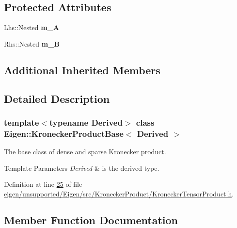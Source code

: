 \subsection*{Protected Attributes}
\begin{DoxyCompactItemize}
\item 
\mbox{\label{class_eigen_1_1_kronecker_product_base_a5d402751e47ece8ca7b14f5ecc113948}} 
Lhs\+::\+Nested {\bfseries m\+\_\+A}
\item 
\mbox{\label{class_eigen_1_1_kronecker_product_base_a4b1239d9d17c42b34c62ce6d0d9f67af}} 
Rhs\+::\+Nested {\bfseries m\+\_\+B}
\end{DoxyCompactItemize}
\subsection*{Additional Inherited Members}


\subsection{Detailed Description}
\subsubsection*{template$<$typename Derived$>$\newline
class Eigen\+::\+Kronecker\+Product\+Base$<$ Derived $>$}

The base class of dense and sparse Kronecker product. 


\begin{DoxyTemplParams}{Template Parameters}
{\em Derived} & is the derived type. \\
\hline
\end{DoxyTemplParams}


Definition at line \hyperlink{eigen_2unsupported_2_eigen_2src_2_kronecker_product_2_kronecker_tensor_product_8h_source_l00025}{25} of file \hyperlink{eigen_2unsupported_2_eigen_2src_2_kronecker_product_2_kronecker_tensor_product_8h_source}{eigen/unsupported/\+Eigen/src/\+Kronecker\+Product/\+Kronecker\+Tensor\+Product.\+h}.



\subsection{Member Function Documentation}
\mbox{\label{class_eigen_1_1_kronecker_product_base_a0b302d4e55f5a58955e6c645d066928f}} 
